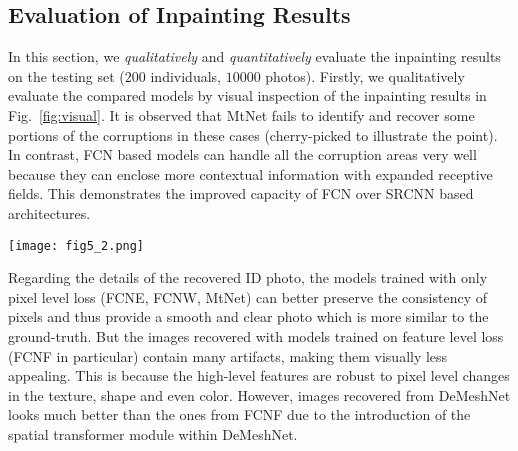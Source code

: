 \documentclass[10pt,twocolumn,letterpaper]{article}
\begin{document}
\subsection{Evaluation of Inpainting Results} In this section, we \textit{qualitatively} and \textit{quantitatively} evaluate the inpainting results on the testing set ($200$ individuals, $10000$ photos).
Firstly, we qualitatively evaluate the compared models by visual inspection of the inpainting results in Fig.~\ref{fig:visual}. It is observed that MtNet fails to identify and recover some portions of the corruptions in these cases (cherry-picked to illustrate the point). In contrast, FCN based models can handle all the corruption areas very well because they can enclose more contextual information with expanded receptive fields. This demonstrates the improved capacity of FCN over SRCNN based architectures.
\begin{figure*}
  \centering
    \texttt{[image: fig5\_2.png]}
    \caption{Visual inspection of the inpainting results. Although these inpainting results all look very well and are quite similar, they will lead to entirely different verification rates because of the different RMSE in the feature space.}
    \label{fig:visual} %
\end{figure*}

Regarding the details of the recovered ID photo, the models trained with only pixel level loss (FCNE, FCNW, MtNet) can better preserve the consistency of pixels and thus provide a smooth and clear photo which is more similar to the ground-truth. But the images recovered with models trained on feature level loss (FCNF in particular) contain many artifacts, making them visually less appealing. This is because the high-level features are robust to pixel level changes in the texture, shape and even color. However, images recovered from DeMeshNet looks much better than the ones from FCNF due to the introduction of the spatial transformer module within DeMeshNet.

\end{document}
